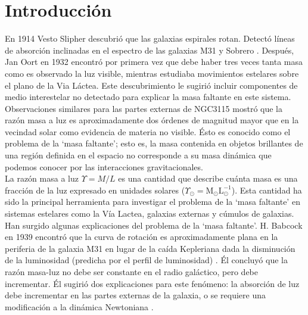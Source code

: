 \chapter{Introducci\'{o}n}

En 1914 Vesto Slipher descubrió que las galaxias espirales rotan. Detectó líneas de absorción inclinadas en el espectro  de las galaxias  M31 y Sobrero \cite{Slipher1914}. Después, Jan Oort en 1932 encontró por primera vez que debe haber tres veces tanta masa como es observado la luz visible, mientras estudiaba movimientos estelares sobre el plano de la Via Láctea. Este descubrimiento le sugirió incluir componentes de medio interestelar no detectado para explicar la masa faltante en este sistema. Observaciones similares para las partes externas de NGC3115 mostró que la razón masa a luz es aproximadamente dos órdenes  de magnitud mayor que en la vecindad solar \cite{Oort40} como evidencia  de materia no visible. Ésto es conocido como el problema de la `masa faltante'; esto es, la masa contenida en objetos brillantes de una región definida en el espacio no corresponde a su masa dinámica que podemos conocer por las interacciones gravitacionales.\\

La razón masa a luz $\Upsilon = M/L$ es una cantidad que describe cuánta masa es una fracción de la luz expresado en unidades solares ($\Upsilon_\odot = \textrm{M}_\odot\textrm{L}_\odot^{-1}$). Esta cantidad ha sido la principal herramienta para investigar el problema de la `masa faltante' en sistemas estelares como la  Vía Lactea, galaxias externas y cúmulos de galaxias.\\

Han surgido algunas explicaciones del problema de la `masa faltante'. H. Babcock en 1939 encontró que la curva de rotación es aproximadamente plana en la periferia  de la galaxia M31 en lugar de la caída Kepleriana dada la disminución de la luminosidad (predicha por el perfil de luminosidad) \cite{Babcock1939}. Él concluyó que la razón masa-luz no debe ser constante en el radio galáctico, pero debe incrementar. Él sugirió dos explicaciones para este fenómeno: la absorción de luz debe incrementar en las partes externas de la galaxia, o se requiere una modificación a la dinámica Newtoniana \cite{Sanders}. \\

